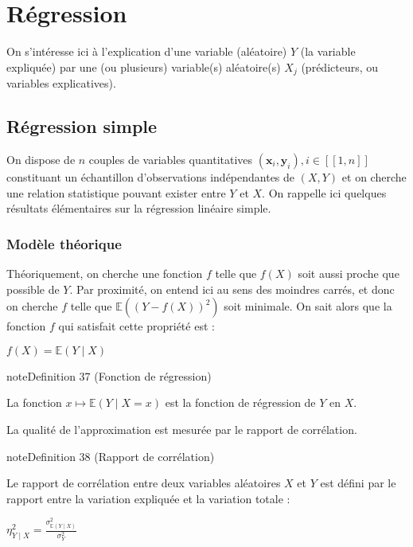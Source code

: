 \documentclass[letterpaper,10pt,french]{sphinxmanual}
\begin{document}
\chapter{Régression}
\label{\detokenize{regression:regression}}\label{\detokenize{regression::doc}}
\ignorespaces 
\sphinxAtStartPar
On s’intéresse ici à l’explication d’une variable (aléatoire) \(Y\) (la variable expliquée) par une (ou plusieurs) variable(s) aléatoire(s) \(X_j\) (prédicteurs, ou variables explicatives).


\section{Régression simple}
\label{\detokenize{regression:regression-simple}}
\sphinxAtStartPar
On dispose de \(n\) couples de variables quantitatives \((\mathbf x_i,\mathbf y_i),i\in[\![1,n]\!]\) constituant un échantillon d’observations indépendantes de \((X,Y)\) et on cherche une relation statistique pouvant exister entre \(Y\) et \(X\).
On rappelle ici quelques résultats élémentaires sur la régression linéaire simple.


\subsection{Modèle théorique}
\label{\detokenize{regression:modele-theorique}}
\sphinxAtStartPar
Théoriquement, on cherche une fonction \(f\) telle que \(f(X)\) soit aussi proche que possible de \(Y\). Par proximité, on entend ici au sens des moindres carrés, et donc on cherche \(f\) telle que \(\mathbb{E}\left ( (Y-f(X))^2\right )\) soit minimale. On sait alors que la fonction \(f\) qui satisfait cette propriété est :

\sphinxAtStartPar
\(f(X) = \mathbb{E}(Y\mid X)\)
\label{regression:definition-0}
\begin{sphinxadmonition}{note}{Definition 37 (Fonction de régression)}



\sphinxAtStartPar
La fonction \(x\mapsto \mathbb{E}(Y\mid X=x)\) est la fonction de régression de \(Y\) en \(X\).
\end{sphinxadmonition}

\sphinxAtStartPar
La qualité de l’approximation est mesurée par le rapport de corrélation.

\ignorespaces \label{regression:definition-1}
\begin{sphinxadmonition}{note}{Definition 38 (Rapport de corrélation)}



\sphinxAtStartPar
Le rapport de corrélation entre deux variables aléatoires \(X\) et \(Y\) est défini par le rapport entre la variation expliquée et la variation totale :

\sphinxAtStartPar
\(\eta_{Y\mid X}^2 = \frac{\sigma_{\mathbb{E}(Y\mid X)}^2}{\sigma_Y^2}\)
\end{sphinxadmonition}
\end{document}
